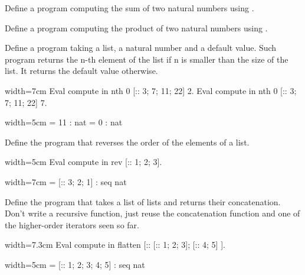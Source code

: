 \begin{Exercise}[label=ex:iteradd,difficulty=0,title={Addition with iteration}]
Define a program computing the sum of two natural numbers
using .
\end{Exercise}

\begin{Exercise}[label=ex:itermul,difficulty=0,title={Multiplication with iteration}]
Define a program computing the product of two natural numbers
using .
\end{Exercise}

\begin{Exercise}[label=ex:nth,difficulty=0,title={Find the n-th element}]
Define a program taking a list, a natural number and a default value.  Such
program returns the n-th element of the list if n is smaller than the size of
the list.  It returns the default value otherwise.

\begin{coq}{}{width=7cm}
Eval compute in
  nth 0 [:: 3; 7; 11; 22] 2.
Eval compute in
  nth 0 [:: 3; 7; 11; 22] 7.
\end{coq}
\begin{coqout}{}{width=5cm}
     = 11
     : nat
     = 0
     : nat
\end{coqout}
\end{Exercise}

\begin{Exercise}[label=ex:rev,difficulty=0,title={List reversal}]
Define the program  that reverses the order of the elements
of a list. 

\begin{coq}{}{width=5cm}
Eval compute in
  rev [:: 1; 2; 3].
\end{coq}
\begin{coqout}{}{width=7cm}
 = [:: 3; 2; 1]
 : seq nat
\end{coqout}
\end{Exercise}

\begin{Exercise}[label=ex:flatten,difficulty=1,title={List flattening}]
Define the program  that takes a list of lists and returns
their concatenation.  Don't write a recursive function, just reuse
the concatenation function and one of the higher-order iterators
seen so far.

\begin{coq}{}{width=7.3cm}
Eval compute in
  flatten [:: [:: 1; 2; 3]; [:: 4; 5] ].
\end{coq}
\begin{coqout}{}{width=5cm}
 = [:: 1; 2; 3; 4; 5]
 : seq nat
\end{coqout}
\end{Exercise}


